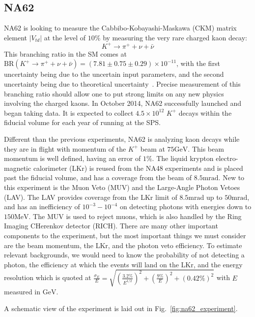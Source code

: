 \subsection{NA62}
NA62 is looking to measure the Cabbibo-Kobayashi-Maskawa (CKM) matrix element $|V_{td}|$ at the level of $10\%$ by measuring the very rare charged kaon decay:
\begin{equation}
K^+ \rightarrow \pi^+ + \nu + \bar{\nu}
\end{equation}
This branching ratio in the SM comes at $\textrm{BR}(K^+ \rightarrow \pi^+ + \nu + \bar{\nu}) = (7.81 \pm 0.75 \pm 0.29) \times 10^{-11}$, with the first uncertainty being due to the uncertain input parameters, and the second uncertainty being due to theoretical uncertainty~\cite{Straub:2010ih}.
Precise measurement of this branching ratio should allow one to put strong limits on any new physics involving the charged kaons.
In October 2014, NA62 successfully launched and began taking data.
It is expected to collect $4.5 \times 10^{12}$ $K^+$ decays within the fiducial volume for each year of running at the SPS.

Different than the previous experiments, NA62 is analyzing kaon decays while they are in flight with momentum of the $K^+$ beam at $75\textrm{GeV}$.
This beam momentum is well defined, having an error of $1\%$.
The liquid krypton electro-magnetic calorimeter (LKr) is reused from the NA48 experiments and is placed past the fiducial volume, and has a coverage from the beam of $8.5\textrm{mrad}$.
New to this experiment is the Muon Veto (MUV) and the Large-Angle Photon Vetoes (LAV).
The LAV provides coverage from the LKr limit of $8.5\textrm{mrad}$ up to $50\textrm{mrad}$, and has an inefficiency of $10^{-3} - 10^{-4}$ on detecting photons with energies down to $150\textrm{MeV}$.
The MUV is used to reject muons, which is also handled by the Ring Imaging CHerenkov detector (RICH).
There are many other important components to the experiment, but the most important things we must consider are the beam momentum, the LKr, and the photon veto efficiency.
To estimate relevant backgrounds, we would need to know the probability of not detecting a photon, the efficiency at which the events will land on the LKr, and the energy resolution which is quoted at $\frac{\sigma_E}{E} = \sqrt{\left(\frac{3.2\%}{E^{1/2}}\right)^2 + \left(\frac{9\%}{E}\right)^2 + (0.42\%)^2}$ with $E$ measured in $\textrm{GeV}$.

A schematic view of the experiment is laid out in Fig.~\ref{fig:na62_experiment}.

